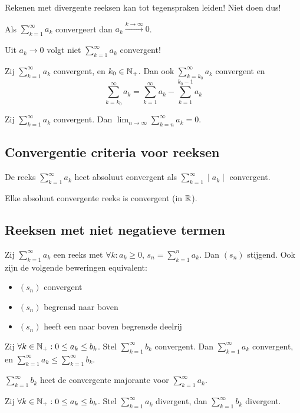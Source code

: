 \documentclass[week=1]{homework}
\begin{document}
	\Letop Rekenen met divergente reeksen kan tot tegenspraken leiden! Niet doen dus!
	
	\Stel[7.1.9] Als $\sum_{k=1}^{\infty} a_k$ convergeert dan $a_k \xrightarrow{k \rightarrow \infty} 0$. 
	
	\Letop Uit $a_k \rightarrow 0$ volgt niet $\sum_{k=1}^{\infty} a_k$ convergent!
	
	\Stel Zij $\sum_{k=1}^{\infty} a_k$ convergent, en $k_0 \in \mathbb{N}_+$. Dan ook $\sum_{k=k_0}^{\infty} a_k$ convergent en 	
	\[
		\sum_{k=k_0}^{\infty} a_k = \sum_{k=1}^{\infty} a_k - \sum_{k=1}^{k_0 - 1} a_k
	\] 
	
	\Stel Zij $\sum_{k=1}^{\infty} a_k$ convergent. Dan $\lim_{n \rightarrow \infty} \sum_{k=n}^{\infty} a_k = 0$.
	
	\subsection*{Convergentie criteria voor reeksen}
	\Def De reeks $\sum_{k=1}^{\infty} a_k$ heet absoluut convergent als $\sum_{k=1}^{\infty} \mid a_k \mid $ convergent. 
	
	\Stel Elke absoluut convergente reeks is convergent (in $\mathbb{R} $). 
	
	\subsection*{Reeksen met niet negatieve termen}
	\Stel Zij $\sum_{k=1}^{\infty} a_k$ een reeks met $\forall k: a_k \ge 0 $, $s_n = \sum_{k=1}^{n} a_k$. Dan $(s_n)$ stijgend. Ook zijn de volgende beweringen equivalent:
	\begin{itemize}
		\item $(s_n)$ convergent
		\item $(s_n)$ begrensd naar boven
		\item $(s_n)$ heeft een naar boven begrensde deelrij
	\end{itemize}
	\Stel[Majorantencriterium] Zij $\forall k \in \mathbb{N}_+: 0 \le a_k \le b_k$. Stel $\sum_{k=1}^{\infty} b_k$ convergent. Dan $\sum_{k=1}^{\infty} a_k$ convergent, en $\sum_{k=1}^{\infty} a_k \le \sum_{k=1}^{\infty} b_k$. 
	
	\Def $\sum_{k=1}^{\infty} b_k$ heet de convergente majorante voor $\sum_{k=1}^{\infty} a_k$. 
	
	\Stel[Minorantencriterium] Zij $\forall k \in \mathbb{N}_+: 0 \le a_k \le b_k$. Stel $\sum_{k=1}^{\infty} a_k$ divergent, dan $\sum_{k=1}^{\infty} b_k$ divergent. 
	
\end{document}
